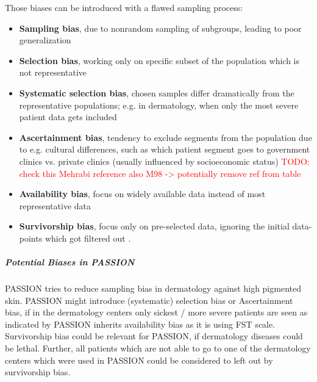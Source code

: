 \documentclass[12pt, a4paper, oneside]{book}   	%
\renewcommand{\todo}[1]{\textcolor{red}{TODO: #1}}
\begin{document}
				Those biases can be introduced with a flawed sampling process:
				\begin{itemize}
					\item \textbf{Sampling bias}, due to nonrandom sampling of subgroups, leading to poor generalization \autocite{Mehrabi_2021}
					\item \textbf{Selection bias}, working only on specific subset of the population which is not representative \autocites{Mestner_2022}{Chakraborty_2024}
					\item \textbf{Systematic selection bias}, chosen samples differ dramatically from the representative populations; e.g. in dermatology, when only the most severe patient data gets included \autocite{Chakraborty_2024, c5,c6,c33}
					\item \textbf{Ascertainment bias}, tendency to exclude segments from the population due to e.g. cultural differences, such as which patient segment goes to government clinics vs. private clinics (usually influenced by socioeconomic status) \autocite{Chakraborty_2024, c5}
					\todo{check this Mehrabi reference also M98 -> potentially remove ref from table}
					\item \textbf{Availability bias}, focus on widely available data instead of most representative data \autocites{Chakraborty_2024, c9, c10}{}
					\item \textbf{Survivorship bias}, focus only on pre-selected data, ignoring the initial data-points which got filtered out \autocite{Mestner_2022}.
				\end{itemize}
				
				
				\subparagraph{Potential Biases in PASSION}
				PASSION tries to reduce sampling bias in dermatology against high pigmented skin.
				PASSION might introduce (systematic) selection bias or Ascertainment bias, if in the dermatology centers only sickest / more severe patients are seen as indicated by \cite{Chakraborty_2024}
				PASSION inherits availability bias as it is using \gls{FST} scale.
				Survivorship bias could be relevant for PASSION, if dermatology diseases could be lethal. Further, all patients which are not able to go to one of the dermatology centers which were used in PASSION could be considered to left out by survivorship bias.
				
\end{document}
